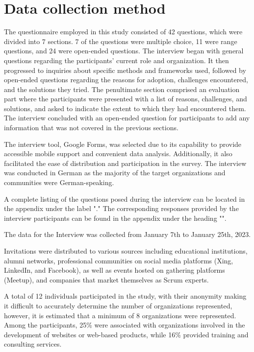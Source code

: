 \section{Data collection method}\label{sec:Datacollectionmethod}
The questionnaire employed in this study consisted of 42 questions, which were divided into 7 sections. 7 of the questions were multiple choice, 11 were range questions, and 24 were open-ended questions. The interview began with general questions regarding the participants' current role and organization. It then progressed to inquiries about specific \glspl{method} and \glspl{framework} used, followed by open-ended questions regarding the reasons for \gls{adoption}, challenges encountered, and the solutions they tried. The penultimate section comprised an evaluation part where the participants were presented with a list of reasons, challenges, and solutions, and asked to indicate the extent to which they had encountered them. The interview concluded with an open-ended question for participants to add any information that was not covered in the previous sections.

The interview tool, Google Forms, was selected due to its capability to provide accessible mobile support and convenient data analysis. Additionally, it also facilitated the ease of distribution and participation in the survey. The interview was conducted in German as the majority of the target organizations and communities were German-speaking.

A complete listing of the questions posed during the interview can be located in the appendix under the label "." The corresponding responses provided by the interview participants can be found in the appendix under the heading "".

The data for the Interview was collected from January 7th to January 25th, 2023. 

Invitations were distributed to various sources including educational institutions, alumni networks, professional communities on social media platforms (Xing, LinkedIn, and Facebook), as well as events hosted on gathering platforms (Meetup), and companies that market themselves as Scrum experts. 

A total of 12 individuals participated in the study, with their anonymity making it difficult to accurately determine the number of organizations represented, however, it is estimated that a minimum of 8 organizations were represented. Among the participants, 25\% were associated with organizations involved in the development of websites or web-based products, while 16\% provided training and consulting services.

